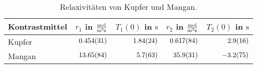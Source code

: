 \begin{table}[H]
    \centering
    \caption{Relaxivitäten von Kupfer und Mangan.}
    \begin{tabular}{|l||r|r|r|r|} \hline
        Kontrastmittel & $r_{1}$ in $\si{\frac{\mol}{\metre \cubed \second}}$    &  $T_{1}(0)$ in $\si{\second}$ & $r_{2}$ in $\si{\frac{\mol}{\metre \cubed \second}}$ & $T_{2}(0)$ in $\si{\second}$  \\ \hline \hline
        Kupfer & $\SI{0.454 \pm 0.031}{}$   & $\SI{1.84 \pm 0.24}{}$    & $\SI{0.617 \pm 0.084}{}$   & $\SI{2.9  \pm 1.6}{}$ \\ \hline
        Mangan & $\SI{13.65 \pm 0.84}{}$    & $\SI{5.7 \pm 6.3}{}$      & $\SI{35.9 \pm 3.1}{}$  & $\SI{-3.2 \pm 7.5}{}$ \\ \hline
    \end{tabular} 
    \label{tab:Relaxivitat} 
\end{table}
    

